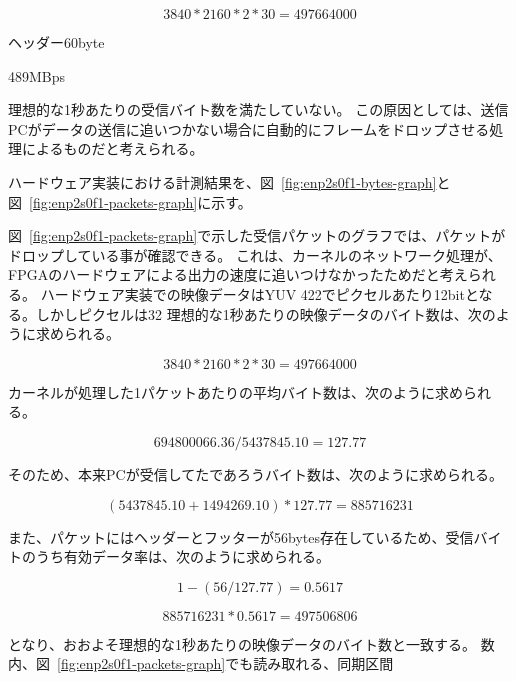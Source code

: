 \[ 3840 * 2160 * 2 * 30 = 497664000 \]

ヘッダー60byte

489MBps


理想的な1秒あたりの受信バイト数を満たしていない。
この原因としては、送信PCがデータの送信に追いつかない場合に自動的にフレームをドロップさせる処理によるものだと考えられる。

ハードウェア実装における計測結果を、図~\ref{fig:enp2s0f1-bytes-graph}と図~\ref{fig:enp2s0f1-packets-graph}に示す。

図~\ref{fig:enp2s0f1-packets-graph}で示した受信パケットのグラフでは、パケットがドロップしている事が確認できる。
これは、カーネルのネットワーク処理が、FPGAのハードウェアによる出力の速度に追いつけなかったためだと考えられる。
ハードウェア実装での映像データはYUV 422でピクセルあたり12bitとなる。しかしピクセルは32
理想的な1秒あたりの映像データのバイト数は、次のように求められる。

\[ 3840 * 2160 * 2 * 30 = 497664000 \]

カーネルが処理した1パケットあたりの平均バイト数は、次のように求められる。

\[ 694800066.36 / 5437845.10 = 127.77 \]

そのため、本来PCが受信してたであろうバイト数は、次のように求められる。

\[ (5437845.10 + 1494269.10) * 127.77 = 885716231 \]

また、パケットにはヘッダーとフッターが56bytes存在しているため、受信バイトのうち有効データ率は、次のように求められる。

\[ 1-(56/127.77) = 0.5617 \]

\[ 885716231 * 0.5617 = 497506806 \]

となり、おおよそ理想的な1秒あたりの映像データのバイト数と一致する。
数内、図~\ref{fig:enp2s0f1-packets-graph}でも読み取れる、同期区間

%




%
%
%
%

